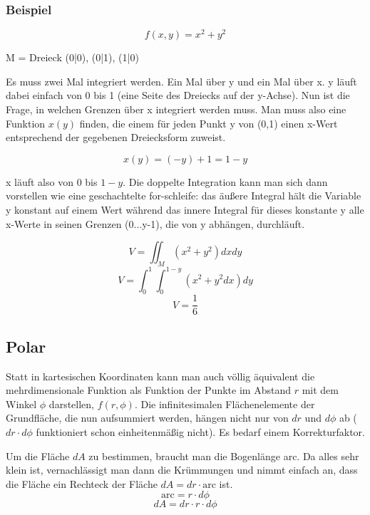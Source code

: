 \documentclass[11pt, a4paper]{article}
\newcommand{\colorEmph}[1]{\textbf{\color{blue-5}#1}}
\begin{document}
\subsubsection{Beispiel}
\[f(x,y) = x^{2} + y^{2}\]
\begin{center}
M = Dreieck (0|0), (0|1), (1|0)
\end{center}

Es muss zwei Mal integriert werden. Ein Mal über y und ein Mal über x. y läuft dabei einfach von 0 bis 1 (eine Seite des Dreiecks auf der y-Achse). Nun ist die Frage, in welchen Grenzen über x integriert werden muss. Man muss also eine Funktion \colorEmph{$x(y)$} finden, die einem für jeden Punkt y von (0,1) einen x-Wert entsprechend der gegebenen Dreiecksform zuweist.

\begin{figure}[H]
\centering
{}
\end{figure}

\[x(y) = (-y) + 1 = 1 - y\]

x läuft also von 0 bis $1-y$. Die doppelte Integration kann man sich dann vorstellen wie eine geschachtelte for-schleife: das äußere Integral hält die Variable y konstant auf einem Wert während das innere Integral für dieses konstante y alle x-Werte in seinen Grenzen (0...y-1), die von y abhängen, durchläuft.

\[V = \iint_{M}{(x^2+y^{2})dxdy}\]
\[V = \int_{0}^{1}{  \int_{0}^{1-y}{(x^{2}+y^{2}dx)}dy  }\]
\[V = \frac{1}{6}\]

\subsection{Polar}
Statt in kartesischen Koordinaten kann man auch völlig äquivalent die mehrdimensionale Funktion als Funktion der Punkte im Abstand $r$ mit dem Winkel $\phi$ darstellen, $f(r,\phi)$. Die infinitesimalen Flächenelemente der Grundfläche, die nun aufsummiert werden, hängen nicht nur von $dr$ und $d\phi$ ab ($dr\cdot d\phi$ funktioniert schon einheitenmäßig nicht). Es bedarf einem Korrekturfaktor.


\begin{figure}[H]
\centering
{}
\end{figure}

Um die Fläche $dA$ zu bestimmen, braucht man die Bogenlänge arc. Da alles sehr klein ist, vernachlässigt man dann die Krümmungen und nimmt einfach an, dass die Fläche ein Rechteck der Fläche $dA = dr \cdot \text{arc}$ ist.
\[\text{arc} = r \cdot d\phi\]
\[dA = dr \cdot r \cdot d\phi\]
\end{document}
